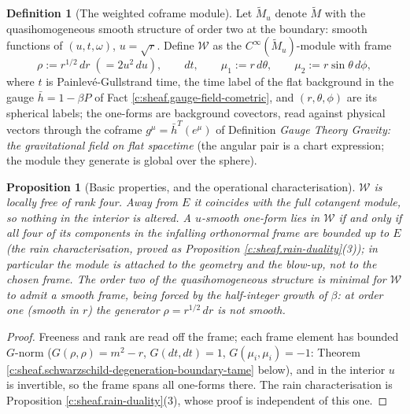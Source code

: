 \documentclass[11pt]{article}
\newtheorem{proposition}[theorem]{Proposition}
\theoremstyle{definition}
\newtheorem{definition}[theorem]{Definition}
\theoremstyle{plain}
\newcommand{\changedmark}[2]{\marginpar{\raggedright\scriptsize\color{#1}#2}}
\providecommand{\Mt}{}\renewcommand{\Mt}{\widetilde{M}}
\providecommand{\dtPG}{}\renewcommand{\dtPG}{dt}
\providecommand{\hb}{}\renewcommand{\hb}{\bar{h}}
\providecommand{\shW}{}\renewcommand{\shW}{\mathcal{W}}
\begin{document}
\begin{definition}[The weighted coframe module]\label{c:obj.sheaf.weighted-coframe-module}
\changedmark{gray}{reworded}
Let $\Mt_u$ denote $\Mt$ with the quasihomogeneous smooth structure of order two at the boundary: smooth functions of $(u, t, \omega)$, $u = \sqrt{r}$. Define $\shW$ as the $C^\infty(\Mt_u)$-module with frame
\[
\rho := r^{1/2}\,dr \;(= 2u^2\,du), \qquad \dtPG, \qquad \mu_1 := r\,d\theta, \qquad \mu_2 := r\sin\theta\,d\phi ,
\]
where $t$ is Painlev\'e-Gullstrand time, the time label of the flat background in the gauge $\hb = 1 - \beta P$ of Fact \ref{c:sheaf.gauge-field-cometric}, and $(r, \theta, \phi)$ are its spherical labels; the one-forms are background covectors, read against physical vectors through the coframe $g^\mu = \hb^{T}(e^\mu)$ of Definition \emph{Gauge Theory Gravity: the gravitational field on flat spacetime} (the angular pair is a chart expression; the module they generate is global over the sphere).
\end{definition}

\begin{proposition}[Basic properties, and the operational characterisation]\label{c:sheaf.basic-properties-operational-characterisation}
$\shW$ is locally free of rank four. Away from $E$ it coincides with the full cotangent module, so nothing in the interior is altered. A $u$-smooth one-form lies in $\shW$ if and only if all four of its components in the infalling orthonormal frame are bounded up to $E$ (the rain characterisation, proved as Proposition \ref{c:sheaf.rain-duality}(3)); in particular the module is attached to the geometry and the blow-up, not to the chosen frame. The order two of the quasihomogeneous structure is minimal for $\shW$ to admit a smooth frame, being forced by the half-integer growth of $\beta$: at order one (smooth in $r$) the generator $\rho = r^{1/2}\,dr$ is not smooth.
\end{proposition}
\begin{proof}
Freeness and rank are read off the frame; each frame element has bounded $G$-norm ($G(\rho,\rho) = m^2 - r$, $G(\dtPG,\dtPG) = 1$, $G(\mu_i,\mu_i) = -1$: Theorem \ref{c:sheaf.schwarzschild-degeneration-boundary-tame} below), and in the interior $u$ is invertible, so the frame spans all one-forms there. The rain characterisation is Proposition \ref{c:sheaf.rain-duality}(3), whose proof is independent of this one.

\end{proof}
\end{document}
